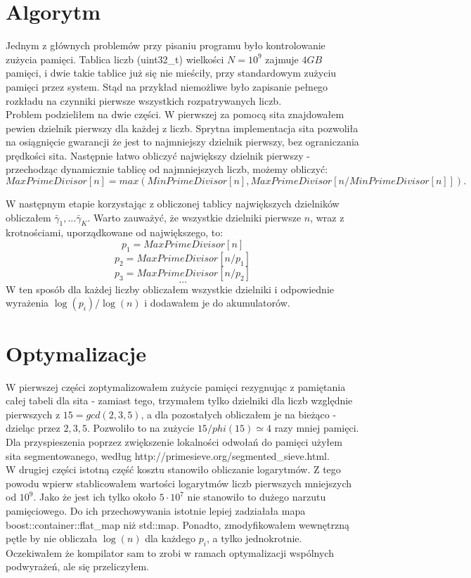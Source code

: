 \documentclass{report}
\begin{document}
\section*{Algorytm}
Jednym z głównych problemów przy pisaniu programu było kontrolowanie zużycia pamięci. Tablica liczb (uint32\_t) wielkości $N = 10^9$ zajmuje $4GB$ pamięci, i dwie takie tablice już się nie mieściły, przy standardowym zużyciu pamięci przez system.
Stąd na przykład niemożliwe było zapisanie pełnego rozkładu na czynniki pierwsze wszystkich rozpatrywanych liczb. \\

Problem podzieliłem na dwie części. W pierwszej za pomocą sita znajdowałem pewien dzielnik pierwszy dla każdej z liczb. Sprytna implementacja sita pozwoliła
na osiągnięcie gwarancji że jest to najmniejszy dzielnik pierwszy, bez ograniczania prędkości sita. Następnie łatwo obliczyć największy dzielnik pierwszy - przechodząc dynamicznie tablicę od najmniejszych liczb, możemy obliczyć:
$$ MaxPrimeDivisor[n] = max(MinPrimeDivisor[n], MaxPrimeDivisor[n/MinPrimeDivisor[n]]). $$

W następnym etapie korzystając z obliczonej tablicy największych dzielników obliczałem $\bar{\gamma}_1, \ldots \bar{\gamma}_K$. Warto zauważyć, że wszystkie dzielniki pierwsze $n$, wraz z krotnościami, uporządkowane od największego, to:
$$ p_1 = MaxPrimeDivisor[n] $$
$$ p_2 = MaxPrimeDivisor[n/p_1] $$
$$ p_3 = MaxPrimeDivisor[n/p_2] $$
$$ \ldots $$
W ten sposób dla każdej liczby obliczałem wszystkie dzielniki i odpowiednie wyrażenia $\log(p_i)/\log(n)$ i dodawałem je do akumulatorów.

\section*{Optymalizacje}

W pierwszej części zoptymalizowałem zużycie pamięci rezygnując z pamiętania całej tabeli dla sita - zamiast tego, trzymałem tylko dzielniki dla liczb względnie pierwszych z $15 = gcd(2, 3, 5)$,
a dla pozostałych obliczałem je na bieżąco - dzieląc przez $2, 3, 5$. Pozwoliło to na zużycie $15 / phi(15) \simeq 4$ razy mniej pamięci. Dla przyspieszenia poprzez zwiększenie lokalności odwołań do pamięci
użyłem sita segmentowanego, według http://primesieve.org/segmented\_sieve.html. \\

W drugiej części istotną część kosztu stanowiło obliczanie logarytmów. Z tego powodu wpierw stablicowałem wartości logarytmów liczb pierwszych mniejszych od $10^9$.
Jako że jest ich tylko około $5\cdot 10^7$ nie stanowiło to dużego narzutu pamięciowego. Do ich przechowywania istotnie lepiej zadziałała mapa boost::container::flat\_map niż std::map.
Ponadto, zmodyfikowałem wewnętrzną pętle by nie obliczała $\log(n)$ dla każdego $p_i$, a tylko jednokrotnie. Oczekiwałem że kompilator sam to zrobi w ramach optymalizacji wspólnych podwyrażeń, ale się przeliczyłem.
\end{document}
